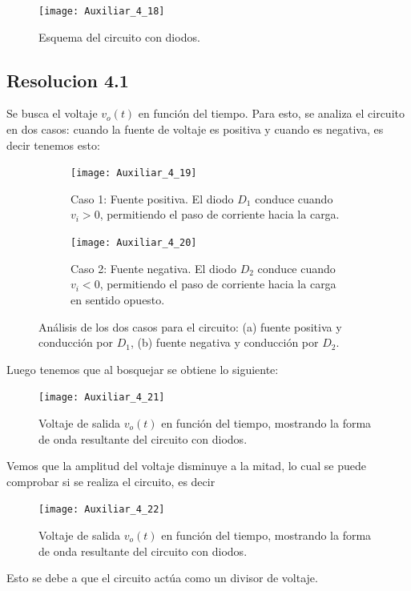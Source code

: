 \documentclass[
  11pt,
  letterpaper,
   addpoints,
   answers
  ]{exam}
\begin{document}
\begin{questions}
\begin{figure}[H]
    \centering
    \texttt{[image: Auxiliar\_4\_18]}
  \caption{Esquema del circuito con diodos.}
    \label{fig:P2_17}
\end{figure}
\begin{solution}
    \subsection*{Resolucion 4.1}
    Se busca el voltaje \(v_o(t)\) en función del tiempo. Para esto, se analiza el circuito en dos casos: cuando la fuente de voltaje es positiva y cuando es negativa, es decir tenemos esto:

  \begin{figure}[H]
    \centering
    \begin{subfigure}[b]{0.48\textwidth}
      \centering
    \texttt{[image: Auxiliar\_4\_19]}
     \caption{Caso 1: Fuente positiva. El diodo $D_1$ conduce cuando $v_i > 0$, permitiendo el paso de corriente hacia la carga.}
      \label{fig:resolucion4.1a}
    \end{subfigure}\hfill
    \begin{subfigure}[b]{0.48\textwidth}
      \centering
      \texttt{[image: Auxiliar\_4\_20]}
     \caption{Caso 2: Fuente negativa. El diodo $D_2$ conduce cuando $v_i < 0$, permitiendo el paso de corriente hacia la carga en sentido opuesto.}
      \label{fig:resolucion4.1b}
    \end{subfigure}
    \caption{Análisis de los dos casos para el circuito: (a) fuente positiva y conducción por $D_1$, (b) fuente negativa y conducción por $D_2$.}
  \label{fig:resolucion4.1}
  \end{figure}
Luego tenemos que al bosquejar se obtiene lo siguiente:
\begin{figure}[H]
  \centering
  \texttt{[image: Auxiliar\_4\_21]}
  \caption{Voltaje de salida \(v_o(t)\) en función del tiempo, mostrando la forma de onda resultante del circuito con diodos.}
  \label{fig:voltaje-salida-4.1}
\end{figure}
Vemos que la amplitud del voltaje disminuye a la mitad, lo cual se puede comprobar si se realiza el circuito, es decir
\begin{figure}[H]
  \centering
  \texttt{[image: Auxiliar\_4\_22]}
  \caption{Voltaje de salida \(v_o(t)\) en función del tiempo, mostrando la forma de onda resultante del circuito con diodos.}
  \label{fig:voltaje-salida-4.1-2}
\end{figure}
Esto se debe a que el circuito actúa como un divisor de voltaje.

\end{solution}
\end{questions}
\end{document}
